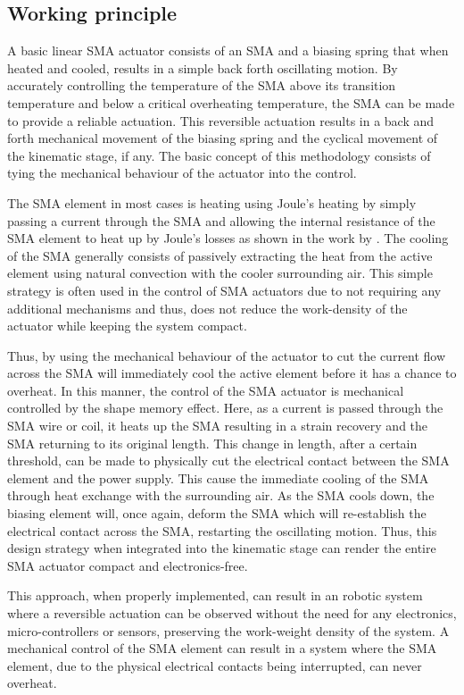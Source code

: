 \subsection{Working principle}

A basic linear SMA actuator consists of an SMA and a biasing spring that when heated and cooled, results in a simple back forth oscillating motion. By accurately controlling the temperature of the SMA above its transition temperature and below a critical overheating temperature, the SMA can be made to provide a reliable actuation. This reversible actuation results in a back and forth mechanical movement of the biasing spring and the cyclical movement of the kinematic stage, if any. The basic concept of this methodology consists of tying the mechanical behaviour of the actuator into the control.

The SMA element in most cases is heating using Joule's heating by simply passing a current through the SMA and allowing the internal resistance of the SMA element to heat up by Joule's losses as shown in the work by \todocite. The cooling of the SMA generally consists of passively extracting the heat from the active element using natural convection with the cooler surrounding air. This simple strategy is often used in the control of SMA actuators due to not requiring any additional mechanisms and thus, does not reduce the work-density of the actuator while keeping the system compact.

Thus, by using the mechanical behaviour of the actuator to cut the current flow across the SMA will immediately cool the active element before it has a chance to overheat. In this manner, the control of the SMA actuator is mechanical controlled by the shape memory effect. Here, as a current is passed through the SMA wire or coil, it heats up the SMA resulting in a strain recovery and the SMA returning to its original length. This change in length, after a certain threshold, can be made to physically cut the electrical contact between the SMA element and the power supply. This cause the immediate cooling of the SMA through heat exchange with the surrounding air. As the SMA cools down, the biasing element will, once again, deform the SMA which will re-establish the electrical contact across the SMA, restarting the oscillating motion. Thus, this design strategy when integrated into the kinematic stage can render the entire SMA actuator compact and electronics-free.

This approach, when properly implemented, can result in an robotic system where a reversible actuation can be observed without the need for any electronics, micro-controllers or sensors, preserving the work-weight density of the system. A mechanical control of the SMA element can result in a system where the SMA element, due to the physical electrical contacts being interrupted, can never overheat.

